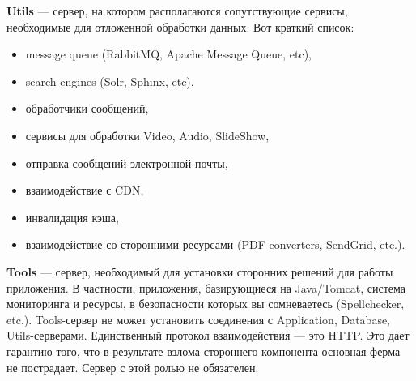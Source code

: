 \documentclass[10pt, a5paper]{article}
\begin{document}
{\bf Utils} --- сервер, на котором располагаются сопутствующие сервисы, необходимые для отложенной обработки данных. Вот краткий список:
\begin{itemize}
\item message queue (RabbitMQ, Apache Message Queue, etc),
\item search engines (Solr, Sphinx, etc),
\item обработчики сообщений,
\item сервисы для обработки Video, Audio, SlideShow,
\item отправка сообщений электронной почты,
\item взаимодействие с CDN,
\item инвалидация кэша,
\item взаимодействие со сторонними ресурсами (PDF converters, SendGrid, etc.). 
\end{itemize}
{\bf Tools} --- сервер, необходимый для установки сторонних решений для работы приложения. В частности, приложения, базирующиеся на Java/Tomcat, система мониторинга и ресурсы, в безопасности которых вы сомневаетесь (Spellchecker, etc.). Tools-сервер не может установить соединения с Application, Database, Utils-серверами. Единственный протокол взаимодействия --- это HTTP. Это дает гарантию того, что в результате взлома стороннего компонента основная ферма не пострадает. Сервер с этой ролью не обязателен. 


\begin{figure}[ht]
\label{pic:fl1}
\end{figure}
\end{document}
